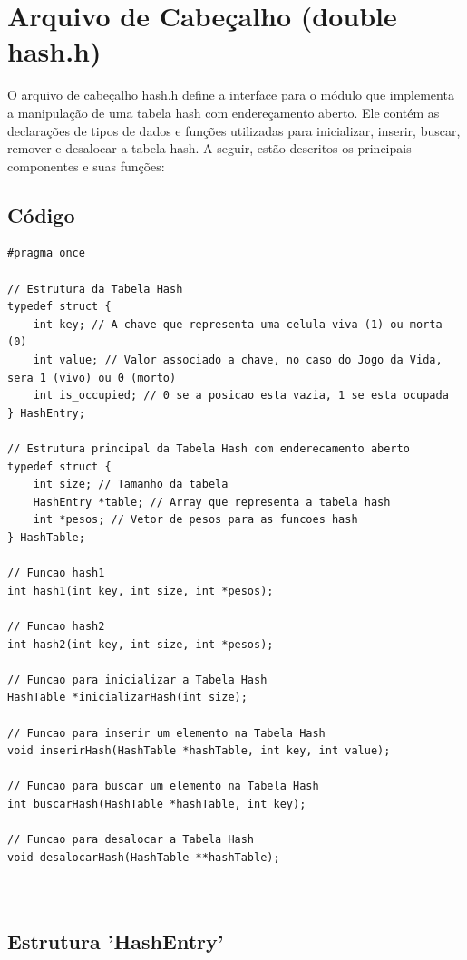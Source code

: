 \documentclass{article}
\begin{document}
\section{Arquivo de Cabeçalho (double hash.h)}

O arquivo de cabeçalho hash.h define a interface para o módulo que implementa a manipulação de uma tabela hash com endereçamento aberto. Ele contém as declarações de tipos de dados e funções utilizadas para inicializar, inserir, buscar, remover e desalocar a tabela hash. A seguir, estão descritos os principais componentes e suas funções: 

\subsection{Código}
\begin{lstlisting}[caption={},label={lst:cod1},language={[x86masm]Assembler}]
#pragma once

// Estrutura da Tabela Hash
typedef struct {
    int key; // A chave que representa uma celula viva (1) ou morta (0)
    int value; // Valor associado a chave, no caso do Jogo da Vida, sera 1 (vivo) ou 0 (morto)
    int is_occupied; // 0 se a posicao esta vazia, 1 se esta ocupada
} HashEntry;

// Estrutura principal da Tabela Hash com enderecamento aberto
typedef struct {
    int size; // Tamanho da tabela
    HashEntry *table; // Array que representa a tabela hash
    int *pesos; // Vetor de pesos para as funcoes hash
} HashTable;

// Funcao hash1
int hash1(int key, int size, int *pesos);

// Funcao hash2
int hash2(int key, int size, int *pesos);

// Funcao para inicializar a Tabela Hash
HashTable *inicializarHash(int size);

// Funcao para inserir um elemento na Tabela Hash
void inserirHash(HashTable *hashTable, int key, int value);

// Funcao para buscar um elemento na Tabela Hash
int buscarHash(HashTable *hashTable, int key);

// Funcao para desalocar a Tabela Hash
void desalocarHash(HashTable **hashTable);

 
 \end{lstlisting}

 \subsection{Estrutura 'HashEntry'}
\end{document}
